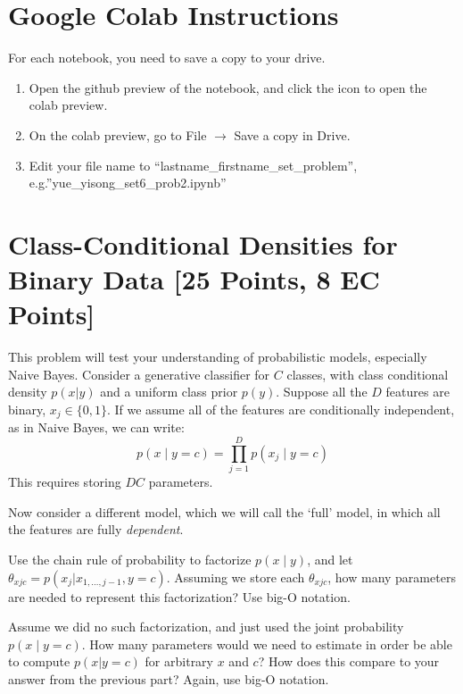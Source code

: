 \section*{Google Colab Instructions}
For each notebook, you need to save a copy to your drive.
\begin{enumerate}
	\item Open the github preview of the notebook, and click the icon to open the colab preview.
	\item On the colab preview, go to File $\rightarrow$ Save a copy in Drive.
	\item Edit your file name to “lastname_firstname_set_problem”, e.g.”yue_yisong_set6_prob2.ipynb”
\end{enumerate}

\newpage

\section{Class-Conditional Densities for Binary Data [25 Points, 8 EC Points]}
This problem will test your understanding of probabilistic models, especially Naive Bayes.
Consider a generative classifier for $C$ classes, with class conditional density $p(x | y)$ and a uniform class prior $p(y)$. Suppose all the $D$ features are binary, $x_j \in \{0, 1 \}$. If we assume all of the features are conditionally independent, as in Naive Bayes, we can write:
$$p(x \mid y = c) = \prod_{j=1}^D p(x_j \mid y = c) $$
This requires storing $DC$ parameters. 

Now consider a different model, which we will call the `full' model, in which all the features are fully \textit{dependent}.

\problem[9] Use the chain rule of probability to factorize $p(x \mid y)$, and let $\theta_{xjc} = p(x_j | x_{1, \ldots, j - 1}, y = c)$. Assuming we store each $\theta_{xjc}$, how many parameters are needed to represent this factorization? Use big-O notation. 

\begin{solution}
\end{solution}

\problem[8] Assume we did no such factorization, and just used the joint probability $p(x \mid y = c)$. How many parameters would we need to estimate in order be able to compute $p(x | y = c)$ for arbitrary $x$ and $c$? How does this compare to your answer from the previous part? Again, use big-O notation.

